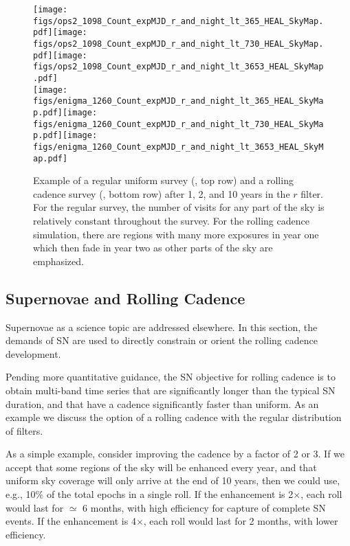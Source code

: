 \begin{figure}
  \texttt{[image: figs/ops2\_1098\_Count\_expMJD\_r\_and\_night\_lt\_365\_HEAL\_SkyMap.pdf]}\texttt{[image: figs/ops2\_1098\_Count\_expMJD\_r\_and\_night\_lt\_730\_HEAL\_SkyMap.pdf]}\texttt{[image: figs/ops2\_1098\_Count\_expMJD\_r\_and\_night\_lt\_3653\_HEAL\_SkyMap.pdf]} \\
  \texttt{[image: figs/enigma\_1260\_Count\_expMJD\_r\_and\_night\_lt\_365\_HEAL\_SkyMap.pdf]}\texttt{[image: figs/enigma\_1260\_Count\_expMJD\_r\_and\_night\_lt\_730\_HEAL\_SkyMap.pdf]}\texttt{[image: figs/enigma\_1260\_Count\_expMJD\_r\_and\_night\_lt\_3653\_HEAL\_SkyMap.pdf]}
  \caption{Example of a regular uniform survey
  (, top row) and a rolling
  cadence survey (, bottom row)
  after 1, 2, and 10 years in the $r$ filter.
  For the regular survey, the number of visits for any part of the sky
  is relatively constant throughout the survey.  For the rolling cadence
  simulation, there are regions with many more exposures in year one
  which then fade in year two as other parts of the sky are
  emphasized.}
  \label{fig:rollingcadence}
\end{figure}



\subsection{Supernovae and Rolling Cadence}
\label{sec:rolling:supernovae}

Supernovae as a science topic are addressed elsewhere.
In this section, the demands of SN are used to directly constrain or
orient the rolling cadence development.

Pending more quantitative guidance, the SN objective for rolling cadence
is to obtain multi-band time series that are significantly longer than
the typical SN duration, and that have a cadence significantly faster
than uniform. As an example we discuss the option of a rolling cadence
with the regular distribution of filters.

As a simple example, consider improving the cadence by a factor of 2 or
3.  If we accept that some regions of the sky will be enhanced every
year, and that uniform sky coverage will only arrive at the end of 10
years, then we could use, e.g., 10\% of the total epochs in a single
roll.  If the enhancement is 2$\times$, each roll would last for
$\simeq$ 6 months, with high efficiency for capture of complete SN
events.  If the enhancement is 4$\times$, each roll would last for 2
months, with lower efficiency.

